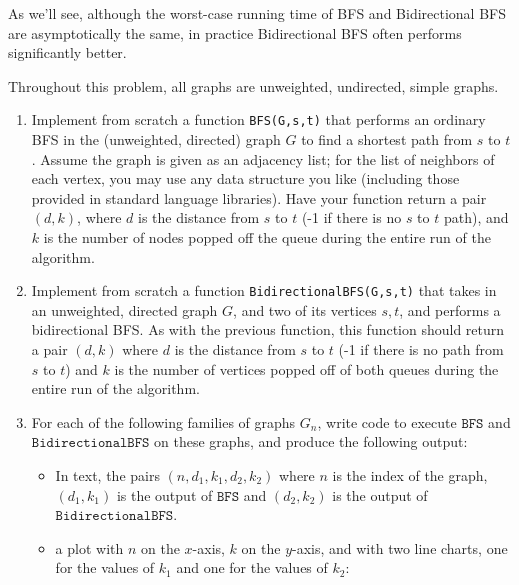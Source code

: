\documentclass[12pt]{article}
\begin{document}
\begin{enumerate}
	As we'll see, although the worst-case running time of BFS and Bidirectional BFS are asymptotically the same, in practice Bidirectional BFS often performs significantly better.
	
	Throughout this problem, all graphs are unweighted, undirected, simple graphs.
	
	\begin{enumerate}
	
	\item Implement from scratch a function \texttt{BFS(G,s,t)} that performs an ordinary BFS in the (unweighted, directed) graph $G$ to find a shortest path from $s$ to $t$. Assume the graph is given as an adjacency list; for the list of neighbors of each vertex, you may use any data structure you like (including those provided in standard language libraries). Have your function return a pair $(d,k)$, where $d$ is the distance from $s$ to $t$ (-1 if there is no $s$ to $t$ path), and $k$ is the number of nodes popped off the queue during the entire run of the algorithm.
	
	\item Implement from scratch a function  \texttt{BidirectionalBFS(G,s,t)} that takes in an unweighted, directed graph $G$, and two of its vertices $s,t$, and performs a bidirectional BFS. As with the previous function, this function should return a pair $(d,k)$ where $d$ is the distance from $s$ to $t$ (-1 if there is no path from $s$ to $t$) and $k$ is the number of vertices popped off of both queues during the entire run of the algorithm.
	
	\item For each of the following families of graphs $G_n$, write code to execute $\texttt{BFS}$ and $\texttt{BidirectionalBFS}$ on these graphs, and produce the following output: 
	\begin{itemize}
	\item In text, the pairs $(n,d_1,k_1,d_2,k_2)$ where $n$ is the index of the graph, $(d_1,k_1)$ is the output of $\texttt{BFS}$ and $(d_2, k_2)$ is the output of $\texttt{BidirectionalBFS}$. 
	\item a plot with $n$ on the $x$-axis, $k$ on the $y$-axis, and with two line charts, one for the values of $k_1$ and one for the values of $k_2$:
	\end{itemize}
	

\end{enumerate}
\end{enumerate}
\end{document}
